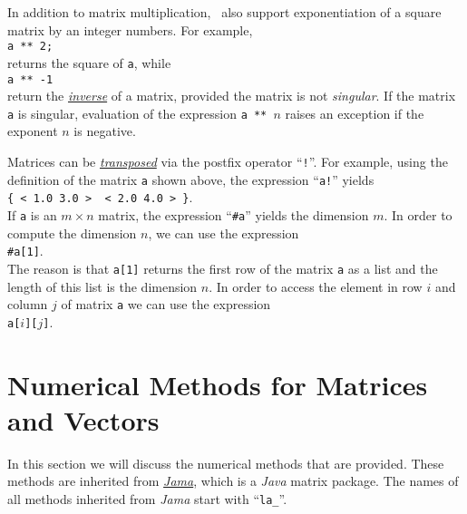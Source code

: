 In addition to matrix multiplication, \setlx\ also support exponentiation of a square matrix by an
integer numbers.  For example, 
\\[0.2cm]
\hspace*{1.3cm}
\texttt{a ** 2;}
\\[0.2cm]
returns the square  of \texttt{a}, while 
\\[0.2cm]
\hspace*{1.3cm}
\texttt{a ** -1}
\\[0.2cm]
return the \href{http://en.wikipedia.org/wiki/Invertible_matrix}{\emph{inverse}} of a matrix,
provided the matrix is not \emph{singular}.  If the matrix \texttt{a} is singular, evaluation of the
expression \texttt{a ** $n$} raises an exception if the exponent $n$ is negative.

Matrices can be \href{http://en.wikipedia.org/wiki/Transpose}{\emph{transposed}} via the postfix
operator ``\texttt{!}''.  For example, using the definition of the matrix \texttt{a} shown above,
the expression ``\texttt{a!}'' yields 
\\[0.2cm]
\hspace*{1.3cm}
\texttt{\{ < 1.0  3.0 > \ < 2.0  4.0 > \}}.
\\[0.2cm]
If \texttt{a} is an $m \times n$ matrix, the expression ``\texttt{\#a}'' yields the dimension $m$.  
In order to compute the dimension $n$, we can use the expression 
\\[0.2cm]
\hspace*{1.3cm}
\texttt{\#a[1]}.
\\[0.2cm]
The reason is that \texttt{a[1]} returns the first row of the matrix \texttt{a} as a list and the
length of this list is the dimension $n$.  In order to access the element in row $i$ and column $j$
of matrix \texttt{a} we can use the expression
\\[0.2cm]
\hspace*{1.3cm}
\texttt{a[$i$][$j$]}.

\section{Numerical Methods for Matrices and Vectors}
In this section we will discuss the numerical methods that are provided.  These methods are inherited
from \href{http://math.nist.gov/javanumerics/jama/}{\textsl{Jama}}, which is a \textsl{Java} matrix
package.  The names of all methods inherited from \textsl{Jama} start with ``\texttt{la\_}''.

